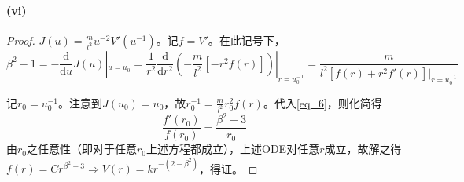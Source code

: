 \documentclass{ctexart}
\begin{document}
\newcommand{\dif}[2]{\frac{\mathrm{d}#1}{\mathrm{d}#2}}
\paragraph{(vi)}
\begin{proof}
  $J(u)=\frac{m}{l^{2}}u^{-2}V'(u^{-1})$。记$f=V'$。在此记号下，
  \begin{equation}\label{eq_6}
    \beta^{2}-1=-\dif{}{u}J(u)|_{u=u_{0}}=\frac{1}{r^{2}}\dif{}{r^{2}}(-\frac{m}{l^{2}}[-r^{2}f(r)])|_{r=u_{0}^{-1}}=\frac{m}{l^{2}[f(r)+r^{2}f'(r)]|_{r=u_{0}^{-1}}}
  \end{equation}

  记$r_{0}=u_{0}^{-1}$。注意到$J(u_{0})=u_{0}$，故$r_{0}^{-1}=\frac{m}{l^{2}}r_{0}^{2}f(r)$。代入\ref{eq_6}，则化简得
  \[\frac{f'(r_{0})}{f(r_{0})}=\frac{\beta^{2}-3}{r_{0}}\]
  由$r_{0}$之任意性（即对于任意$r_{0}$上述方程都成立），上述ODE对任意$r$成立，故解之得$f(r)=Cr^{\beta^{2}-3}\Rightarrow V(r)=kr^{-(2-\beta^{2})}$，得证。
\end{proof}
\end{document}
